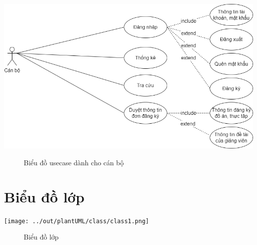     \begin{center}
      \includegraphics[width=.9\textwidth]{../drawio/usecase55.png}
      \begin{figure}[h]
        \centering
        \caption{Biểu đồ usecase dành cho cán bộ}
      \end{figure}
    \end{center}

  \section{Biểu đồ lớp}
    \begin{center}
      \texttt{[image: ../out/plantUML/class/class1.png]}
      \begin{figure}[h]
        \centering
        \caption{Biểu đồ lớp}
      \end{figure}
    \end{center}
